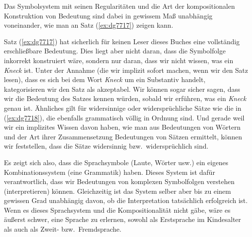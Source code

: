 Das Symbolsystem mit seinen Regularitäten und die Art der kompositionalen Konstruktion von Bedeutung sind dabei in gewissem Maß unabhängig voneinander, wie man an Satz (\ref{ex:dg7717}) zeigen kann.

\begin{exe}
\end{exe}

Satz (\ref{ex:dg7717}) hat sicherlich für keinen Leser dieses Buches eine vollständig er\-schließ\-bare Bedeutung.
Dies liegt aber nicht daran, dass die Symbolfolge inkorrekt konstruiert wäre, sondern nur daran, dass wir nicht wissen, was ein \textit{Kneck} ist.
Unter der Annahme (die wir implizit sofort machen, wenn wir den Satz lesen), dass es sich bei dem Wort \textit{Kneck} um ein Substantiv handelt, kategorisieren wir den Satz als akzeptabel.
Wir können sogar sicher sagen, dass wir die Bedeutung des Satzes kennen würden, sobald wir erführen, was ein \textit{Kneck} genau ist.
Ähnliches gilt für widersinnige oder widersprüchliche Sätze wie die in (\ref{ex:dg7718}), die ebenfalls grammatisch völlig in Ordnung sind.
Und gerade weil wir ein implizites Wissen davon haben, wie man aus Bedeutungen von Wörtern und der Art ihrer Zusammensetzung Bedeutungen von Sätzen ermittelt, können wir feststellen, dass die Sätze widersinnig bzw.\ widersprüchlich sind.

\begin{exe}
  \ex\label{ex:dg7718}
  \begin{xlist}
  \end{xlist}
\end{exe}

Es zeigt sich also, dass die Sprachsymbole (Laute, Wörter usw.) ein eigenes Kombinationssystem (eine Grammatik) haben.
Dieses System ist dafür verantwortlich, dass wir Bedeutungen von komplexen Symbolfolgen verstehen (interpretieren) können.
Gleichzeitig ist das System selber aber bis zu einem gewissen Grad unabhängig davon, ob die Interpretation tatsächlich erfolgreich ist.
Wenn es dieses Sprachsystem und die Kompositionalität nicht gäbe, wäre es äußerst schwer, eine Sprache zu erlernen, sowohl als Erstsprache im Kindesalter als auch als Zweit- bzw.\ Fremdsprache.

